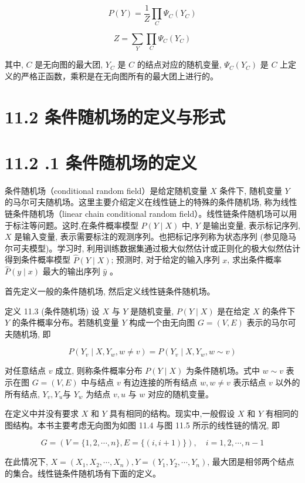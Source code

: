 \documentclass[10pt]{article}
\begin{document}
\begin{CJK*}{UTF8}{bsmi}
$$
P(Y)=\frac{1}{Z} \prod_{C} \Psi_{C}\left(Y_{C}\right)
$$

$$
Z=\sum_{Y} \prod_{C} \Psi_{C}\left(Y_{C}\right)
$$

其中, $C$ 是无向图的最大团, $Y_{C}$ 是 $C$ 的结点对应的随机变量, $\Psi_{C}\left(Y_{C}\right)$ 是 $C$ 上定义的严格正函数，乘积是在无向图所有的最大团上进行的。

\section*{11.2 条件随机场的定义与形式}
\section*{11.2 .1 条件随机场的定义}
条件随机场（conditional random field）是给定随机变量 $X$ 条件下, 随机变量 $Y$ 的马尔可夫随机场。这里主要介绍定义在线性链上的特殊的条件随机场, 称为线性链条件随机场（linear chain conditional random field）。线性链条件随机场可以用于标注等问题。这时,在条件概率模型 $P(Y \mid X)$ 中, $Y$ 是输出变量, 表示标记序列, $X$ 是输入变量, 表示需要标注的观测序列。也把标记序列称为状态序列 (参见隐马尔可夫模型)。学习时, 利用训练数据集通过极大似然估计或正则化的极大似然估计得到条件概率模型 $\hat{P}(Y \mid X)$; 预测时, 对于给定的输入序列 $x$, 求出条件概率 $\hat{P}(y \mid x)$ 最大的输出序列 $\hat{y}$ 。

首先定义一般的条件随机场, 然后定义线性链条件随机场。

定义 11.3 (条件随机场) 设 $X$ 与 $Y$ 是随机变量, $P(Y \mid X)$ 是在给定 $X$ 的条件下 $Y$ 的条件概率分布。若随机变量 $Y$ 构成一个由无向图 $G=(V, E)$ 表示的马尔可夫随机场, 即


\begin{equation*}
P\left(Y_{v} \mid X, Y_{w}, w \neq v\right)=P\left(Y_{v} \mid X, Y_{w}, w \sim v\right) \tag{11.8}
\end{equation*}


对任意结点 $v$ 成立, 则称条件概率分布 $P(Y \mid X)$ 为条件随机场。式中 $w \sim v$ 表示在图 $G=(V, E)$ 中与结点 $v$ 有边连接的所有结点 $w, w \neq v$ 表示结点 $v$ 以外的所有结点, $Y_{v}, Y_{u}$与 $Y_{w}$ 为结点 $v, u$ 与 $w$ 对应的随机变量。

在定义中并没有要求 $X$ 和 $Y$ 具有相同的结构。现实中,一般假设 $X$ 和 $Y$ 有相同的图结构。本书主要考虑无向图为如图 11.4 与图 11.5 所示的线性链的情况, 即

$$
G=(V=\{1,2, \cdots, n\}, E=\{(i, i+1)\}), \quad i=1,2, \cdots, n-1
$$

在此情况下, $X=\left(X_{1}, X_{2}, \cdots, X_{n}\right), Y=\left(Y_{1}, Y_{2}, \cdots, Y_{n}\right)$, 最大团是相邻两个结点的集合。线性链条件随机场有下面的定义。


\end{CJK*}
\end{document}
